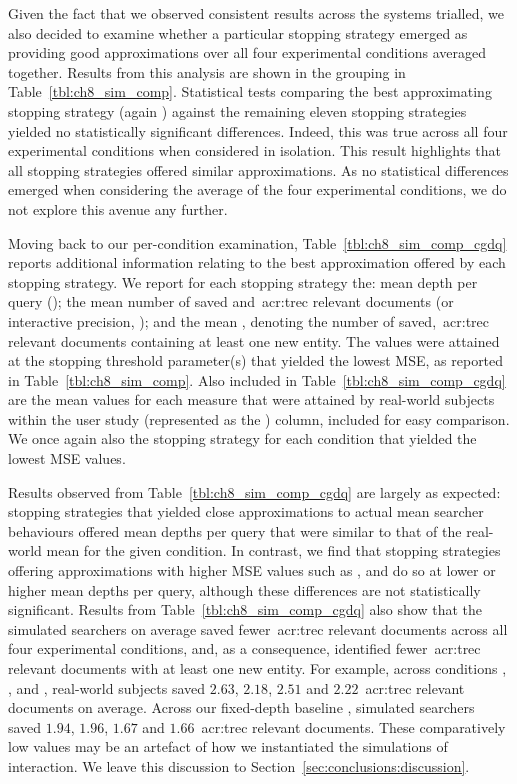 Given the fact that we observed consistent results across the systems trialled, we also decided to examine whether a particular stopping strategy emerged as providing good approximations over all four experimental conditions averaged together. Results from this analysis are shown in the  grouping in Table~\ref{tbl:ch8_sim_comp}. Statistical tests comparing the best approximating stopping strategy (again ) against the remaining eleven stopping strategies yielded no statistically significant differences. Indeed, this was true across all four experimental conditions when considered in isolation. This result highlights that all stopping strategies offered similar approximations. As no statistical differences emerged when considering the average of the four experimental conditions, we do not explore this avenue any further.

Moving back to our per-condition examination, Table~\ref{tbl:ch8_sim_comp_cgdq} reports additional information relating to the best approximation offered by each stopping strategy. We report for each stopping strategy the: mean depth per query (); the mean number of saved and~\gls{acr:trec} relevant documents (or interactive precision, ); and the mean , denoting the number of saved,~\gls{acr:trec} relevant documents containing at least one new entity. The values were attained at the stopping threshold parameter(s) that yielded the lowest MSE, as reported in Table~\ref{tbl:ch8_sim_comp}. Also included in Table~\ref{tbl:ch8_sim_comp_cgdq} are the mean values for each measure that were attained by real-world subjects within the user study (represented as the ) column, included for easy comparison. We once again also  the stopping strategy for each condition that yielded the lowest MSE values.

Results observed from Table~\ref{tbl:ch8_sim_comp_cgdq} are largely as expected: stopping strategies that yielded close approximations to actual mean searcher behaviours offered mean depths per query that were similar to that of the real-world mean for the given condition. In contrast, we find that stopping strategies offering approximations with higher MSE values such as ,  and  do so at lower or higher mean depths per query, although these differences are not statistically significant. Results from Table~\ref{tbl:ch8_sim_comp_cgdq} also show that the simulated searchers on average saved fewer~\gls{acr:trec} relevant documents across all four experimental conditions, and, as a consequence, identified fewer~\gls{acr:trec} relevant documents with at least one new entity. For example, across conditions , ,  and , real-world subjects saved $2.63$, $2.18$, $2.51$ and $2.22$~\gls{acr:trec} relevant documents on average. Across our fixed-depth baseline , simulated searchers saved $1.94$, $1.96$, $1.67$ and $1.66$~\gls{acr:trec} relevant documents. These comparatively low values may be an artefact of how we instantiated the simulations of interaction. We leave this discussion to Section~\ref{sec:conclusions:discussion}.

